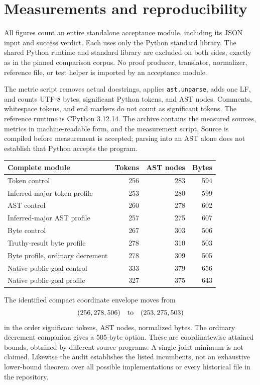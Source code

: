 \documentclass[11pt,letterpaper]{article}
\theoremstyle{definition}
\begin{document}
\section{Measurements and reproducibility}
\label{sec:measurements}

All figures count an entire standalone acceptance module, including its
JSON input and success verdict. Each uses only the Python standard
library. The shared Python runtime and standard library are excluded on
both sides, exactly as in the pinned comparison corpus. No proof producer,
translator, normalizer, reference file, or test helper is imported by an
acceptance module.

The metric script removes actual docstrings, applies \texttt{ast.unparse},
adds one LF, and counts UTF-8 bytes, significant Python tokens, and AST
nodes. Comments, whitespace tokens, and end markers do not count as
significant tokens. The reference runtime is CPython 3.12.14. The archive
contains the measured sources, metrics in machine-readable form, and the
measurement script. Source is compiled before measurement is accepted;
parsing into an AST alone does not establish that Python accepts the
program.

\begin{center}\small
\begin{tabular}{lrrr}
\toprule
Complete module & Tokens & AST nodes & Bytes\\
\midrule
Token control & 256 & 283 & 594\\
Inferred-major token profile & 253 & 280 & 599\\
AST control & 260 & 278 & 602\\
Inferred-major AST profile & 257 & 275 & 607\\
Byte control & 267 & 303 & 506\\
Truthy-result byte profile & 278 & 310 & 503\\
Byte profile, ordinary decrement & 278 & 309 & 505\\
Native public-goal control & 333 & 379 & 656\\
Native public-goal profile & 327 & 375 & 643\\
\bottomrule
\end{tabular}
\end{center}

The identified compact coordinate envelope moves from
\[
      (256,278,506)\quad\hbox{to}\quad(253,275,503)
\]
in the order significant tokens, AST nodes, normalized bytes. The ordinary
decrement companion gives a 505-byte option. These are coordinatewise
attained bounds, obtained by different source programs. A single joint
minimum is not claimed. Likewise the audit establishes the listed
incumbents, not an exhaustive lower-bound theorem over all possible
implementations or every historical file in the repository.
\end{document}
